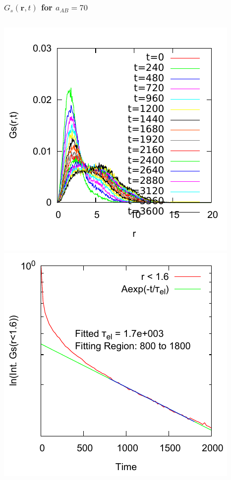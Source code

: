 \documentclass[12pt, dvipdfmx]{beamer}
\begin{document}
\begin{frame}
\frametitle{$G_s(\bm{r}, t)$ for $a_{AB}=70$}

\begin{columns}[T, totalwidth=\linewidth]
		\includegraphics[width=\columnwidth]{./fig/AB70/Ave_Trj.pdf}
		\includegraphics[width=\columnwidth]{./fig/AB70/Cuml_data_6.pdf}
\end{columns}

\end{frame}
\end{document}
